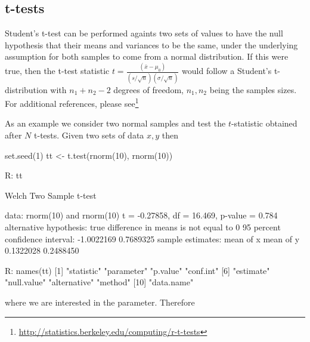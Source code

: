\subsection{t-tests}
Student's t-test can be performed againts two 
sets of values to have the null hypothesis that their
means and variances to be the same, under the underlying 
assumption for both samples to come from a normal distribution.
If this were true, then the t-test statistic  
$t=\frac{(\bar{x}-\mu_0)}{(s/\sqrt{n})(\sigma/\sqrt{n})}$ would follow
a Student's t-distribution with $n_1 + n_2 -2$ degrees
of freedom, $n_1, n_2$ being the samples sizes.
For additional references, please see\footnote{ 
\url{http://statistics.berkeley.edu/computing/r-t-tests}
}
\medskip 

As an example we consider two normal samples and test 
the $t$-statistic obtained after $N$ t-tests. Given 
two sets of data $x, y$ then
\begin{example}
set.seed(1)
tt <- t.test(rnorm(10), rnorm(10))

R: tt

	Welch Two Sample t-test

data:  rnorm(10) and rnorm(10)
t = -0.27858, df = 16.469, p-value = 0.784
alternative hypothesis: true difference 
in means is not equal to 0
95 percent confidence interval:
 -1.0022169  0.7689325
sample estimates:
mean of x mean of y 
0.1322028 0.2488450 

R: names(tt)
[1] "statistic"   "parameter"   "p.value"     "conf.int"       
[6] "estimate" "null.value"  "alternative" "method"      
[10] "data.name"
\end{example}
where we are interested in the  parameter.
Therefore
